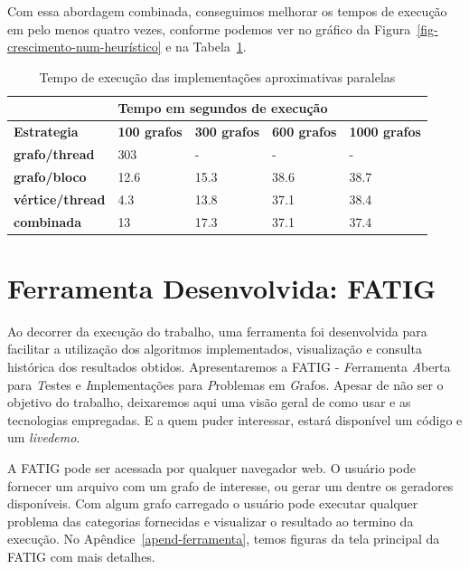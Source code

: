 Com essa abordagem combinada, conseguimos melhorar os tempos de execução em pelo menos quatro vezes,
conforme podemos ver no gráfico da Figura~\ref{fig-crescimento-num-heurístico} e na Tabela~\ref{tab-speedups-paralelos}.

\begin{table}[H]
\centering
\caption{Tempo de execução das implementações aproximativas paralelas}
\label{tab-speedups-paralelos}
\begin{tabular}{l|l|l|l|l|}
\cline{2-5}
                                              & \multicolumn{4}{l|}{\textbf{Tempo em segundos de execução}}                            \\ \hline
\multicolumn{1}{|l|}{\textbf{Estrategia}}     & \textbf{100 grafos} & \textbf{300 grafos} & \textbf{600 grafos} & \textbf{1000 grafos} \\ \hline
\multicolumn{1}{|l|}{\textbf{grafo/thread}}   & 303                 & -                   & -                   & -                    \\ \hline
\multicolumn{1}{|l|}{\textbf{grafo/bloco}}    & 12.6                & 15.3                & 38.6                & 38.7                 \\ \hline
\multicolumn{1}{|l|}{\textbf{vértice/thread}} & 4.3                 & 13.8                & 37.1                & 38.4                 \\ \hline
\multicolumn{1}{|l|}{\textbf{combinada}}      & 13                  & 17.3                & 37.1                & 37.4                 \\ \hline
\end{tabular}
\end{table}


\section{Ferramenta Desenvolvida: FATIG}

Ao decorrer da execução do trabalho, uma ferramenta foi desenvolvida para facilitar a utilização dos algoritmos implementados, visualização e consulta histórica dos resultados obtidos. Apresentaremos a FATIG - {\it F}erramenta {\it A}berta para {\it T}estes e {\it I}mplementações para {\it P}roblemas em {\it G}rafos.
Apesar de não ser o objetivo do trabalho, deixaremos aqui uma visão geral de como usar e as tecnologias empregadas. 
E a quem puder interessar, estará disponível um código e um \textit{livedemo}.

A FATIG pode ser acessada por qualquer navegador web. O usuário pode fornecer um arquivo com um grafo de interesse,
ou gerar um dentre os geradores disponíveis. 
Com algum grafo carregado o usuário pode executar 
qualquer problema das categorias fornecidas e
visualizar o resultado ao termino da execução. No Apêndice~\ref{apend-ferramenta},
temos figuras da tela principal da FATIG com mais detalhes.


